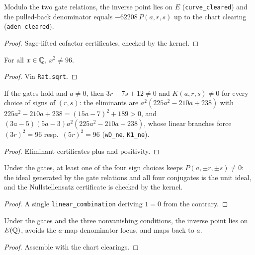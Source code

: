 \begin{lemma}\label{lem:inversecleared}
\leanok
{}
Modulo the two gate relations, the inverse point lies on $E$
(\texttt{curve\_cleared}) and the pulled-back denominator equals
$-62208\,P(a,r,s)$ up to the chart clearing (\texttt{aden\_cleared}).
\end{lemma}
\begin{proof}\leanok
Sage-lifted cofactor certificates, checked by the kernel.
\end{proof}

\begin{lemma}\label{lem:sq96}
\leanok
For all $x \in \mathbb{Q}$, $x^2 \neq 96$.
\end{lemma}
\begin{proof}\leanok
Via \texttt{Rat.sqrt}.
\end{proof}

\begin{lemma}\label{lem:denoms}
\leanok
{}
If the gates hold and $a \neq 0$, then $3r-7s+12 \neq 0$ and
$K(a,r,s) \neq 0$ for every choice of signs of $(r,s)$: the eliminants
are $a^2(225a^2-210a+238)$ with $225a^2-210a+238 = (15a-7)^2+189 > 0$,
and $(3a-5)(5a-3)a^2(225a^2-210a+238)$, whose linear branches force
$(3r)^2 = 96$ resp.\ $(5r)^2 = 96$
(\texttt{wD\_ne}, \texttt{K1\_ne}).
\end{lemma}
\begin{proof}\leanok
Eliminant certificates plus  and positivity.
\end{proof}

\begin{lemma}\label{lem:cover}
\leanok
{}
Under the gates, at least one of the four sign choices keeps
$P(a,\pm r,\pm s) \neq 0$: the ideal generated by the gate relations and
all four conjugates is the unit ideal, and the Nullstellensatz
certificate is checked by the kernel.
\end{lemma}
\begin{proof}\leanok
A single \texttt{linear\_combination} deriving $1 = 0$ from the contrary.
\end{proof}

\begin{lemma}\label{lem:core}
\leanok
{}
Under the gates and the three nonvanishing conditions, the inverse point
lies on $E(\mathbb{Q})$, avoids the $a$-map denominator locus, and maps back to
$a$.
\end{lemma}
\begin{proof}\leanok
Assemble  with the chart clearings.
\end{proof}

